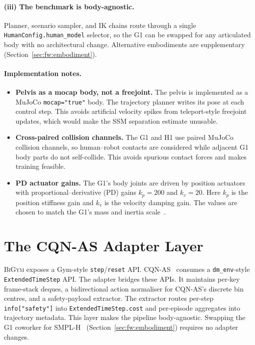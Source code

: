 \documentclass[11pt,a4paper]{report}
\newcommand{\ssm}{SSM}
\newcommand{\bigym}{\textsc{BiGym}}
\newcommand{\cqnas}{CQN-AS}
\begin{document}
\paragraph{(iii) The benchmark is body-agnostic.}
Planner, scenario sampler, and IK chains route through a single
\texttt{HumanConfig.human\_model} selector, so the G1 can be swapped
for any articulated body with no architectural change. Alternative
embodiments are supplementary
(Section~\ref{sec:fw:embodiment}).

\paragraph{Implementation notes.}

\begin{itemize}[topsep=2pt,itemsep=2pt]
\item \textbf{Pelvis as a mocap body, not a freejoint.}
  The pelvis is implemented as a MuJoCo \texttt{mocap="true"} body.
  The trajectory planner writes its pose at each control step. This
  avoids artificial velocity spikes from teleport-style freejoint
  updates, which would make the \ssm{} separation estimate unusable.
\item \textbf{Cross-paired collision channels.}
  The G1 and H1 use paired MuJoCo collision channels, so human--robot
  contacts are considered while adjacent G1 body parts do not
  self-collide. This avoids spurious contact forces and makes training
  feasible.
\item \textbf{PD actuator gains.}
  The G1's body joints are driven by position actuators with
  proportional--derivative (PD) gains $k_p = 200$ and $k_v = 20$.
  Here $k_p$ is the position stiffness gain and $k_v$ is the velocity
  damping gain. The values are chosen to match the G1's mass and
  inertia scale~\cite{unitree_g1}.
\end{itemize}

\section{The \cqnas{} Adapter Layer}
\label{sec:bench:adapter}

\bigym{} exposes a Gym-style \texttt{step}/\texttt{reset} API.
\cqnas{}~\cite{seo2024cqnas} consumes a \texttt{dm\_env}-style
\texttt{ExtendedTimeStep} API. The adapter bridges these APIs. It
maintains per-key frame-stack deques, a bidirectional action
normaliser for \cqnas{}'s discrete bin centres, and a safety-payload
extractor. The extractor routes per-step \texttt{info["safety"]} into
\texttt{ExtendedTimeStep.cost} and per-episode aggregates into
trajectory metadata. This layer makes the pipeline body-agnostic.
Swapping the G1 coworker for SMPL-H~\cite{romero2017smplh}
(Section~\ref{sec:fw:embodiment}) requires no adapter changes.
\end{document}
